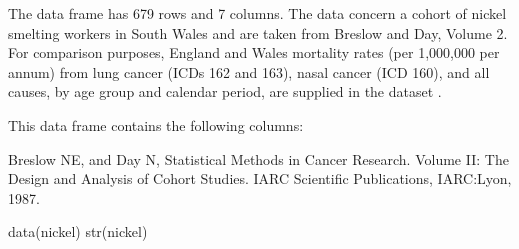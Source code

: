 \begin{Description}\relax
The  data frame has 679 rows and 7 columns.
The data concern a cohort of nickel smelting workers in South Wales and
are taken from Breslow and Day, Volume 2. For comparison purposes,
England and Wales mortality rates (per 1,000,000 per annum)
from lung cancer (ICDs 162 and 163),
nasal cancer (ICD 160), and all causes, by age group and calendar period, are
supplied in the dataset .
\end{Description}
\begin{Format}\relax
This data frame contains the following columns:
\end{Format}
\begin{Source}\relax
Breslow NE, and Day N, Statistical Methods in Cancer Research. Volume
II: The Design and Analysis of Cohort Studies. IARC Scientific
Publications, IARC:Lyon, 1987.
\end{Source}
\begin{Examples}
\begin{ExampleCode}
data(nickel)
str(nickel)
\end{ExampleCode}
\end{Examples}

